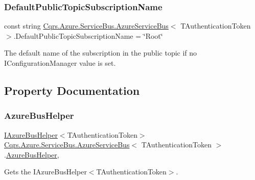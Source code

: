 \subsubsection{\texorpdfstring{Default\+Public\+Topic\+Subscription\+Name}{DefaultPublicTopicSubscriptionName}}
{\footnotesize\ttfamily const string \hyperlink{classCqrs_1_1Azure_1_1ServiceBus_1_1AzureServiceBus}{Cqrs.\+Azure.\+Service\+Bus.\+Azure\+Service\+Bus}$<$ T\+Authentication\+Token $>$.Default\+Public\+Topic\+Subscription\+Name = \char`\"{}Root\char`\"{}\hspace{0.3cm}{\ttfamily [protected]}}



The default name of the subscription in the public topic if no I\+Configuration\+Manager value is set. 



\subsection{Property Documentation}
\mbox{\label{classCqrs_1_1Azure_1_1ServiceBus_1_1AzureServiceBus_a7c537c53265bf01d550982c04579493e_a7c537c53265bf01d550982c04579493e}} 
\subsubsection{\texorpdfstring{Azure\+Bus\+Helper}{AzureBusHelper}}
{\footnotesize\ttfamily \hyperlink{interfaceCqrs_1_1Azure_1_1ServiceBus_1_1IAzureBusHelper}{I\+Azure\+Bus\+Helper}$<$T\+Authentication\+Token$>$ \hyperlink{classCqrs_1_1Azure_1_1ServiceBus_1_1AzureServiceBus}{Cqrs.\+Azure.\+Service\+Bus.\+Azure\+Service\+Bus}$<$ T\+Authentication\+Token $>$.\hyperlink{classCqrs_1_1Azure_1_1ServiceBus_1_1AzureBusHelper}{Azure\+Bus\+Helper}\hspace{0.3cm}{\ttfamily [get]}, {\ttfamily [protected]}}



Gets the I\+Azure\+Bus\+Helper$<$\+T\+Authentication\+Token$>$. 

\mbox{\label{classCqrs_1_1Azure_1_1ServiceBus_1_1AzureServiceBus_aba45a2bece8e265b9f06695b1e90a2a1_aba45a2bece8e265b9f06695b1e90a2a1}} 
